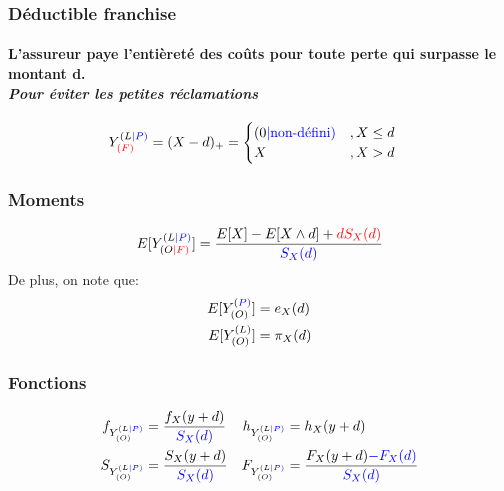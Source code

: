 \documentclass[10pt, french]{article}
\begin{document}
\begin{multicols*}{3}
\subsubsection*{Déductible franchise}
\paragraph{L'assureur paye l'entièreté des coûts pour toute perte qui surpasse le montant d.\\ \textit{Pour éviter les petites réclamations}}
\begin{align*}
Y^{(L\textcolor{blue}{|P)}}_{\color{red}{(F)}} &= (X-d)_+ = 
	\begin{cases}
		(0 {\color{blue}{| \text{non-défini})}}		& , X \leq d \\
		X		& , X > d \\
	\end{cases} 
\end{align*}

\subsubsection*{Moments}
\begin{align*}
E[Y_{(O\textcolor{red}{|F)}}^{(L\textcolor{blue}{|P)}}] &= \frac{E[X] - E[X \wedge d] + \textcolor{red}{d S_X(d)} }{\textcolor{blue}{S_X(d)}} \\
\end{align*}
De plus, on note que:
\begin{align*}
E[Y_{(O)}^{(\textcolor{blue}{P)}}] &= e_X(d) \\
E[Y_{(O)}^{(L)}] &= \pi_X(d)
\end{align*}

\subsubsection*{Fonctions}
\begin{align*}
f_{Y^{(L\textcolor{blue}{|P)}}_{(O)}} &= \frac{f_X(y+d)}{\textcolor{blue}{S_X(d)}} &
h_{Y^{(L\textcolor{blue}{|P)}}_{(O)}} &= h_X(y+d) \\
S_{Y^{(L\textcolor{blue}{|P)}}_{(O)}} &= \frac{S_X(y+d)}{\textcolor{blue}{S_X(d)}} &
F_{Y^{(L\textcolor{blue}{|P)}}_{(O)}} &= \frac{F_X(y+d) \textcolor{blue}{- F_X(d)}}{\textcolor{blue}{S_X(d)}} \\
\end{align*}



\end{multicols*}
\end{document}
